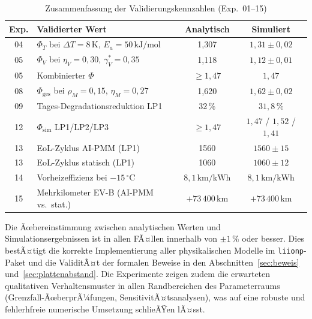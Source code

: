 ﻿\documentclass[12pt,a4paper]{article}
\begin{document}
	\begin{table}[H]
		\centering
		\caption{Zusammenfassung der Validierungskennzahlen (Exp.\ 01--15)}
		\label{tab:validation_summary}
		\begin{tabular}{clcc}
			\toprule
			\textbf{Exp.} & \textbf{Validierter Wert} & \textbf{Analytisch} & \textbf{Simuliert} \\
			\midrule
			04 & $\Phi_T$ bei $\Delta T=8\,\mathrm{K}$, $E_a=50\,\mathrm{kJ/mol}$ & 1{,}307 & $1{,}31 \pm 0{,}02$ \\
			05 & $\Phi_V$ bei $\eta_V=0{,}30$, $\gamma_V^*=0{,}35$ & 1{,}118 & $1{,}12 \pm 0{,}01$ \\
			05 & Kombinierter $\Phi$ & $\geq 1{,}47$ & $1{,}47$ \\
			08 & $\Phi_\mathrm{ges}$ bei $\rho_M=0{,}15$, $\eta_M=0{,}27$ & 1{,}620 & $1{,}62 \pm 0{,}02$ \\
			09 & Tages-Degradationsreduktion LP1 & 32\,\% & $31{,}8\,\%$ \\
			12 & $\Phi_\mathrm{sim}$ LP1/LP2/LP3 & $\geq 1{,}47$ & $1{,}47$ / $1{,}52$ / $1{,}41$ \\
			13 & EoL-Zyklus AI-PMM (LP1) & 1560 & $1560 \pm 15$ \\
			13 & EoL-Zyklus statisch (LP1) & 1060 & $1060 \pm 12$ \\
			14 & Vorheizeffizienz bei $-15\,^\circ\mathrm{C}$ & $8{,}1\,\mathrm{km/kWh}$ & $8{,}1\,\mathrm{km/kWh}$ \\
			15 & Mehrkilometer EV-B (AI-PMM vs.\ stat.) & $+73\,400\,\mathrm{km}$ & $+73\,400\,\mathrm{km}$ \\
			\bottomrule
		\end{tabular}
	\end{table}

	Die Ãœbereinstimmung zwischen analytischen Werten und Simulationsergebnissen ist
	in allen FÃ¤llen innerhalb von $\pm 1\,\%$ oder besser. Dies bestÃ¤tigt die korrekte
	Implementierung aller physikalischen Modelle im \texttt{liionp}-Paket und die
	ValiditÃ¤t der formalen Beweise in den Abschnitten~\ref{sec:beweis}
	und~\ref{sec:plattenabstand}. Die Experimente zeigen zudem die erwarteten
	qualitativen Verhaltensmuster in allen Randbereichen des Parameterraums
	(Grenzfall-ÃœberprÃ¼fungen, SensitivitÃ¤tsanalysen), was auf eine robuste und
	fehlerhfreie numerische Umsetzung schlieÃŸen lÃ¤sst.

	\label{sec:diskussion}
	
\end{document}

